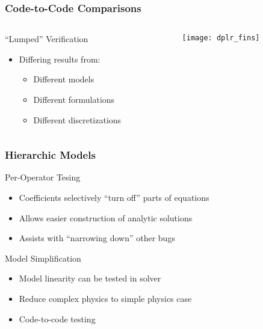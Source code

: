 \begin{frame}
\frametitle{Code-to-Code Comparisons}
\begin{columns}
\begin{column}{.5\textwidth}
\begin{block}{``Lumped'' Verification}
\begin{itemize}
\item Differing results from:
\begin{itemize}
\item Different models
\item Different formulations
\item Different discretizations
\end{itemize}
\end{itemize}
\end{block}
\end{column}
\begin{column}{.5\textwidth}
\begin{center}
\texttt{[image: dplr\_fins]}
\end{center}
\end{column}
\end{columns}

\end{frame}

\begin{frame}
\frametitle{Hierarchic Models}
\begin{block}{Per-Operator Tesing}
\begin{itemize}
\item Coefficients selectively ``turn off'' parts of equations
\item Allows easier construction of analytic solutions
\item Assists with ``narrowing down'' other bugs
\end{itemize}
\end{block}

\begin{block}{Model Simplification}
\begin{itemize}
\item Model linearity can be tested in solver
\item Reduce complex physics to simple physics case
\item Code-to-code testing
\end{itemize}
\end{block}

\end{frame}

